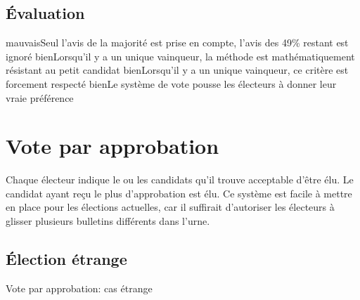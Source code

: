 \documentclass[../report]{subfiles}
\begin{document}
  \subsection{Évaluation}
  \tabcritere%
    {mauvais}{Seul l'avis de la majorité est prise en compte, l'avis des 49\% restant est ignoré}%
    {bien}{Lorsqu'il y a un unique vainqueur, la méthode est mathématiquement résistant au petit candidat}%
    {bien}{Lorsqu'il y a un unique vainqueur, ce critère est forcement respecté}%
    {bien}{Le système de vote pousse les électeurs à donner leur vraie préférence}


  \section{Vote par approbation}

  Chaque électeur indique le ou les candidats qu'il trouve acceptable d'être élu.
  Le candidat ayant reçu le plus d'approbation est élu.
  Ce système est facile à mettre en place pour les élections actuelles, car il suffirait d'autoriser
  les électeurs à glisser plusieurs bulletins différents dans l'urne.

  \subsection{Élection étrange}

  \begin{table}[h]
    \begin{center}
      \caption{Vote par approbation: cas étrange}%
      \label{fig:diff:appro:caslim1}
    \end{center}
  \end{table}
\end{document}
